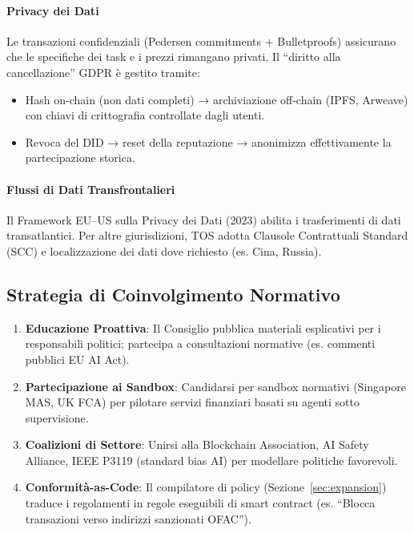 \documentclass[11pt]{article}
\begin{document}
\begin{itemize}[noitemsep]
\paragraph{Privacy dei Dati}
Le transazioni confidenziali (Pedersen commitments + Bulletproofs) assicurano che le specifiche dei task e i prezzi rimangano privati. Il ``diritto alla cancellazione'' GDPR è gestito tramite:
\begin{itemize}[noitemsep]
  \item Hash on-chain (non dati completi) → archiviazione off-chain (IPFS, Arweave) con chiavi di crittografia controllate dagli utenti.
  \item Revoca del DID → reset della reputazione → anonimizza effettivamente la partecipazione storica.
\end{itemize}

\paragraph{Flussi di Dati Transfrontalieri}
Il Framework EU--US sulla Privacy dei Dati (2023) abilita i trasferimenti di dati transatlantici. Per altre giurisdizioni, TOS adotta Clausole Contrattuali Standard (SCC) e localizzazione dei dati dove richiesto (es. Cina, Russia).

\subsection{Strategia di Coinvolgimento Normativo}

\begin{enumerate}[noitemsep]
  \item \textbf{Educazione Proattiva}: Il Consiglio pubblica materiali esplicativi per i responsabili politici; partecipa a consultazioni normative (es. commenti pubblici EU AI Act).
  \item \textbf{Partecipazione ai Sandbox}: Candidarsi per sandbox normativi (Singapore MAS, UK FCA) per pilotare servizi finanziari basati su agenti sotto supervisione.
  \item \textbf{Coalizioni di Settore}: Unirsi alla Blockchain Association, AI Safety Alliance, IEEE P3119 (standard bias AI) per modellare politiche favorevoli.
  \item \textbf{Conformità-as-Code}: Il compilatore di policy (Sezione~\ref{sec:expansion}) traduce i regolamenti in regole eseguibili di smart contract (es. ``Blocca transazioni verso indirizzi sanzionati OFAC'').
\end{enumerate}


\end{itemize}
\end{document}
